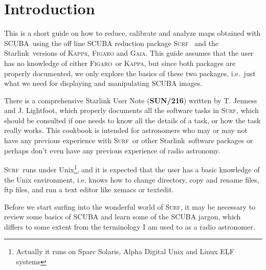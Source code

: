 \documentclass[twoside,11pt]{article}
\newcommand{\stardocinitials}  {SC}
\newcommand{\stardocnumber}    {11.1}
\newcommand{\stardocabstract}  {[Text of abstract]}
\newcommand{\scuba}{\htmladdnormallink{SCUBA}{http://www.jach.hawaii.edu/JCMT/}}
\newcommand{\starlink}{\htmladdnormallink{Starlink}{http://star-www.rl.ac.uk/}}
\newcommand{\Kappa}{\xref{\textsc{Kappa}}{sun95}{}}
\newcommand{\Figaro}{\xref{\textsc{Figaro}}{sun86}{}}
\newcommand{\gaia}{\xref{\textsc{Gaia}}{sun214}{}}
\newcommand{\surf}{\xref{\textsc{Surf}}{sun216}{}}
\newcommand{\stardocname}{\stardocinitials /\stardocnumber}
\newcommand{\htmladdnormallink}[2]{#1}
\newenvironment{latexonly}{}{}
\newcommand{\xref}[3]{#1}
\newcommand{\xlabel}[1]{}
\newcommand{\latexonlytoc}[0]{\tableofcontents}
\renewcommand{\thepage}{\roman{page}}
\begin{document}
 \newpage
 \begin{latexonly}
   \setlength{\parskip}{0mm}
   \latexonlytoc
   \setlength{\parskip}{\medskipamount}
   \markboth{\stardocname}{\stardocname}
 \end{latexonly}
\cleardoublepage
\renewcommand{\thepage}{\arabic{page}}
\setcounter{page}{1}


\section{\xlabel{introduction}Introduction}

This is a short guide on how to reduce, calibrate and analyze maps obtained
with \scuba\ using the off line SCUBA reduction package \surf\ \cite{surf} and
the \starlink\ versions of \Kappa \cite{kappa}, \Figaro \cite{figaro} and
\gaia \cite{gaia}. This guide assumes that the user has no knowledge of either
\Figaro\ or \Kappa, but since both packages are properly documented, we only
explore the basics of these two packages, i.e.\ just what we need for
displaying and manipulating SCUBA images.

There is a comprehensive Starlink User Note
(\xref{\textbf{SUN/216}}{sun216}{}) written by T. Jenness and J. Lightfoot,
which properly documents all the software tasks in \surf, which should be
consulted if one needs to know all the details of a task, or how the task
really works. This cookbook is intended for astronomers who may or may not
have any previous experience with \surf\ or other \starlink\ software packages
or perhaps don't even have any previous experience of radio astronomy.

\surf\ runs under Unix\footnote{Actually it runs on Sparc Solaris, Alpha
Digital Unix and Linux ELF systems}, and it is expected that the user has a
basic knowledge of the Unix environment, i.e. knows how to change directory,
copy and rename files, ftp files, and run a text editor like
\htmladdnormallink{xemacs}{http://www.xemacs.org} or
textedit.

Before we start surfing into the wonderful world of \surf, it may be
necessary to review some basics of SCUBA and learn some of the SCUBA
jargon, which differs to some extent from the terminology I am used to
as a radio astronomer.
\end{document}
